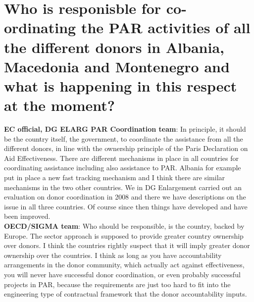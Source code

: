 \section{Who is responisble for co-ordinating the PAR activities of all the different donors in Albania, Macedonia and Montenegro and what is happening in this respect at the moment? }
\label{sec:moment}
\textbf{EC official, DG ELARG PAR Coordination team}: In principle, it should be the country itself, the government, to coordinate the assistance from all the different donors, in line with the ownership principle of the Paris Declaration on Aid Effectiveness. There are different mechanisms in place in all countries for coordinating assistance including also assistance to PAR. Albania for example put in place a new fast tracking mechanism and I think there are similar mechanisms in the two other countries. We in DG Enlargement carried out an evaluation on donor coordination in 2008 and there we have descriptions on the issue in all three countries. Of course since then things have developed and have been improved. \\
\textbf{OECD/SIGMA team}: Who should be responsible, is the country, backed by Europe. The sector approach is supposed to provide greater country ownership over donors. I think the countries rightly suspect that it will imply greater donor ownership over the countries. I think as long as you have accountability arrangements in the donor community, which actually act against effectiveness, you will never have successful donor coordination, or even probably successful projects in PAR, because the requirements are just too hard to fit into the engineering type of contractual framework that the
donor accountability inputs.\\
